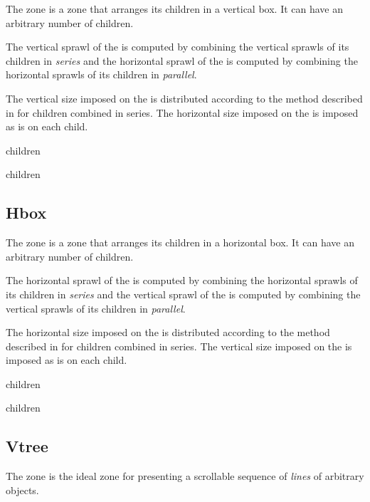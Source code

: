 The  zone is a zone that arranges its children in a
vertical box.  It can have an arbitrary number of children.

The vertical sprawl of the  is computed by combining the
vertical sprawls of its children in \emph{series} and the horizontal
sprawl of the  is computed by combining the horizontal
sprawls of its children in \emph{parallel}.

The vertical size imposed on the  is distributed according
to the method described in 
for children combined in series.  The horizontal size imposed on the
 is imposed as is on each child. 


 {children}

 {\rest children}

\subsection{Hbox}
\label{sec-zones-layout-hbox}

The  zone is a zone that arranges its children in a
horizontal box.  It can have an arbitrary number of children.

The horizontal sprawl of the  is computed by combining the
horizontal sprawls of its children in \emph{series} and the vertical
sprawl of the  is computed by combining the vertical
sprawls of its children in \emph{parallel}.

The horizontal size imposed on the  is distributed according
to the method described in 
for children combined in series.  The vertical size imposed on the
 is imposed as is on each child. 


 {children}

 {\rest children}

\subsection{Vtree}
\label{sec-zones-layout-vtree}

The  zone is the ideal zone for presenting a scrollable
sequence of \emph{lines} of arbitrary objects.

